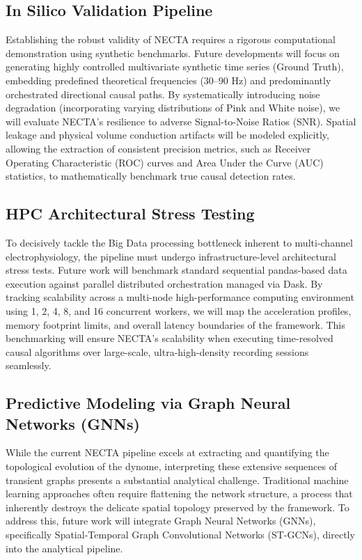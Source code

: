 \subsection{In Silico Validation Pipeline}
Establishing the robust validity of NECTA requires a rigorous computational demonstration using synthetic benchmarks. Future developments will focus on generating highly controlled multivariate synthetic time series (Ground Truth), embedding predefined theoretical frequencies (30--90 Hz) and predominantly orchestrated directional causal paths. By systematically introducing noise degradation (incorporating varying distributions of Pink and White noise), we will evaluate NECTA's resilience to adverse Signal-to-Noise Ratios (SNR). Spatial leakage and physical volume conduction artifacts will be modeled explicitly, allowing the extraction of consistent precision metrics, such as Receiver Operating Characteristic (ROC) curves and Area Under the Curve (AUC) statistics, to mathematically benchmark true causal detection rates.

\subsection{HPC Architectural Stress Testing}
To decisively tackle the Big Data processing bottleneck inherent to multi-channel electrophysiology, the pipeline must undergo infrastructure-level architectural stress tests. Future work will benchmark standard sequential pandas-based data execution against parallel distributed orchestration managed via Dask. By tracking scalability across a multi-node high-performance computing environment using 1, 2, 4, 8, and 16 concurrent workers, we will map the acceleration profiles, memory footprint limits, and overall latency boundaries of the framework. This benchmarking will ensure NECTA's scalability when executing time-resolved causal algorithms over large-scale, ultra-high-density recording sessions seamlessly.

\subsection{Predictive Modeling via Graph Neural Networks (GNNs)}
While the current NECTA pipeline excels at extracting and quantifying the topological evolution of the dynome, interpreting these extensive sequences of transient graphs presents a substantial analytical challenge. Traditional machine learning approaches often require flattening the network structure, a process that inherently destroys the delicate spatial topology preserved by the framework. To address this, future work will integrate Graph Neural Networks (GNNs), specifically Spatial-Temporal Graph Convolutional Networks (ST-GCNs), directly into the analytical pipeline. 

